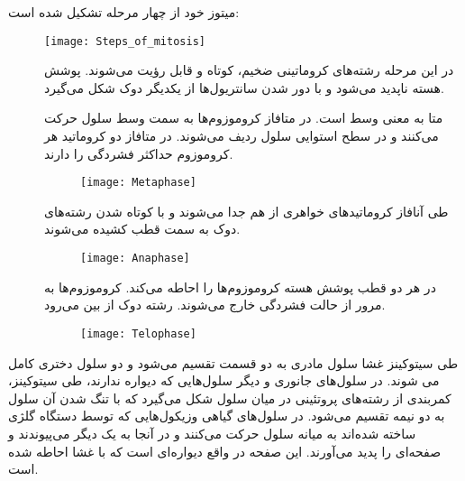 \bigskip
\bigskip
\bigskip
میتوز خود از چهار مرحله تشکیل شده است:

\begin{figure}[h]
	\centering 
	\texttt{[image: Steps\_of\_mitosis]}
\end{figure}

\begin{description}
\item[]
در این مرحله رشته‌های کروماتینی ضخیم، کوتاه و قابل رؤیت می‌شوند. پوشش هسته ناپدید می‌شود و با دور شدن سانتریول‌ها از یکدیگر دوک شکل می‌گیرد.

\begin{figure}[h]
	\centering
\end{figure}

\pagebreak
\item[]
متا به معنی وسط است.
در متافاز کروموزوم‌ها به سمت وسط سلول حرکت می‌کنند و در سطح استوایی سلول ردیف می‌شوند. در متافاز دو کروماتید هر کروموزوم حداکثر فشردگی را دارند.

\begin{figure}[h]
	\centering
	\texttt{[image: Metaphase]}
\end{figure}

\item[]
طی آنافاز کروماتید‌های خواهری از هم جدا می‌شوند و با کوتاه شدن رشته‌های دوک به سمت قطب کشیده می‌شوند.

\begin{figure}[h]
	\centering
	\texttt{[image: Anaphase]}
\end{figure}

\item[]
در هر دو قطب پوشش هسته کروموزوم‌ها را احاطه می‌کند. کروموزوم‌ها به مرور از حالت فشردگی خارج می‌شوند. رشته دوک از بین می‌رود. 

\begin{figure}[h]
	\centering
	\texttt{[image: Telophase]}
\end{figure}

\end{description}

\pagebreak
طی سیتوکینز غشا سلول مادری به دو قسمت تقسیم می‌شود و دو سلول دختری کامل می شوند. در سلول‌های جانوری و دیگر سلول‌هایی که دیواره ندارند، طی سیتوکینز، کمربندی از رشته‌های پروتئینی در میان سلول شکل می‌گیرد که با تنگ شدن آن سلول به دو نیمه تقسیم می‌شود. در سلول‌های گیاهی وزیکول‌هایی که توسط دستگاه گلژی ساخته شده‌اند به میانه سلول حرکت می‌کنند و در آنجا به یک دیگر می‌پیوندند و صفحه‌ای را پدید می‌آورند. این صفحه در واقع دیواره‌ای است که با غشا احاطه شده است.

